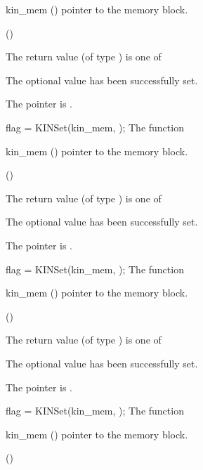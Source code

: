 {
  \begin{args}
  \item[kin\_mem] ()
    pointer to the {\kinsol} memory block.
  \item[] (\id{})

  \end{args}
}
{
  The return value  (of type ) is one of
  \begin{args}
  \item[\Id{KIN\_SUCCESS}] 
    The optional value has been successfully set.
  \item[\Id{KIN\_MEM\_NULL}]
    The  pointer is .
  \end{args}
}
{}
{
flag = KINSet(kin\_mem, );
}
{
  The function 
}
{
  \begin{args}
  \item[kin\_mem] ()
    pointer to the {\kinsol} memory block.
  \item[] (\id{})

  \end{args}
}
{
  The return value  (of type ) is one of
  \begin{args}
  \item[\Id{KIN\_SUCCESS}] 
    The optional value has been successfully set.
  \item[\Id{KIN\_MEM\_NULL}]
    The  pointer is .
  \end{args}
}
{}
{
flag = KINSet(kin\_mem, );
}
{
  The function 
}
{
  \begin{args}
  \item[kin\_mem] ()
    pointer to the {\kinsol} memory block.
  \item[] (\id{})

  \end{args}
}
{
  The return value  (of type ) is one of
  \begin{args}
  \item[\Id{KIN\_SUCCESS}] 
    The optional value has been successfully set.
  \item[\Id{KIN\_MEM\_NULL}]
    The  pointer is .
  \end{args}
}
{}
{
flag = KINSet(kin\_mem, );
}
{
  The function 
}
{
  \begin{args}
  \item[kin\_mem] ()
    pointer to the {\kinsol} memory block.
  \item[] (\id{})

  \end{args}
}
